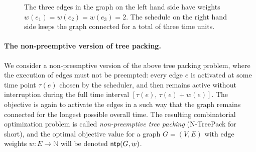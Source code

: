 \documentclass[runningheads]{llncs}
\newcommand{\N}{\mathbb{N}}
\DeclareMathOperator{\ntp}{\text{\sf ntp}}
\newcommand{\xxxNTP}{{\sc N-TreePack}}
\begin{document}
\begin{figure}[tbh]
\bigskip
\begin{center}
\qquad\qquad\qquad
\end{center}
\caption{The three edges in the graph on the left hand side have weights $w(e_1)=w(e_2)=w(e_3)=2$.
The schedule on the right hand side keeps the graph connected for a total of three time units.}
\label{fig:example}
\end{figure}

\paragraph{The non-preemptive version of tree packing.}
We consider a non-preemptive version of the above tree packing problem,
where the execution of edges must not be preempted: 
every edge $e$ is activated at some time point $\tau(e)$ chosen by the scheduler, and then 
remains active without interruption during the full time interval $[\tau(e),\,\tau(e)+w(e)]$.
The objective is again to activate the edges in a such way that the graph
remains connected for the longest possible overall time.
The resulting combinatorial optimization problem is called \emph{non-preemptive tree packing}
({\xxxNTP} for short), and the optimal objective value for a graph $G=(V,E)$ with edge 
weights $w:E\to\N$ will be denoted $\ntp(G,w)$.
\end{document}
